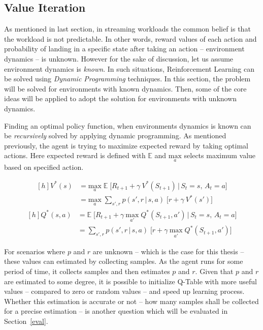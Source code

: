 \subsection{Value Iteration}
\label{des:val}
As mentioned in last section, in streaming workloads the common belief is that the workload is not predictable. In other words, reward values of each action and probability of landing in a specific state after taking an action -- environment dynamics -- is unknown. However for the sake of discussion, let us assume environment dynamics is \emph{known}. In such situations, Reinforcement Learning can be solved using \emph{Dynamic Programming} techniques. In this section, the problem will be solved for environments with known dynamics. Then, some of the core ideas will be applied to adopt the solution for environments with unknown dynamics.

Finding an optimal policy function, when environments dynamics is known can be \emph{recursively} solved by applying dynamic programming. As mentioned previously, the agent is trying to maximize expected reward by taking optimal actions. Here expected reward is defined with $\mathbb E$ and $\underset{a}{\text{max}}$ selects maximum value based on specified action.

\begin{equation}
\begin{aligned}[h]
V^*(s) &= \underset{a}{\text{max}} \; \mathbb E\;\big[R_{t+1} + \gamma\:V^*(S_{t+1})\,|\,S_t=s,\,A_t=a\big] \\
&= \underset{a}{\text{max}} \; \sum_{s',r} p(s',r\,|\,s,a)\;\Big[r + \gamma\:V^*(s')\Big]
\end{aligned}
\label{des:eq:dpv}
\end{equation}
\begin{equation}
\begin{aligned}[h]
Q^*(s,a) &= \mathbb E\;\big[R_{t+1} + \gamma\:\underset{a'}{\text{max}}\;Q^*(S_{t+1},a')\,|\,S_t=s,\,A_t=a\big] \\
&= \sum_{s',r} p(s',r\,|\,s,a)\;\Big[r + \gamma\:\underset{a'}{\text{max}}\;Q^*(S_{t+1},a')\Big]
\end{aligned}
\label{des:eq:dpq}
\end{equation}

For scenarios where $p$ and $r$ are unknown -- which is the case for this thesis -- these values can estimated by collecting samples. As the agent runs for some period of time, it collects samples and then estimates $p$ and $r$. Given that $p$ and $r$ are estimated to some degree, it is possible to initialize Q-Table with more useful values -- compared to zero or random values -- and speed up learning process. Whether this estimation is accurate or not -- how many samples shall be collected for a precise estimation -- is another question which will be evaluated in Section~\ref{eval}.

